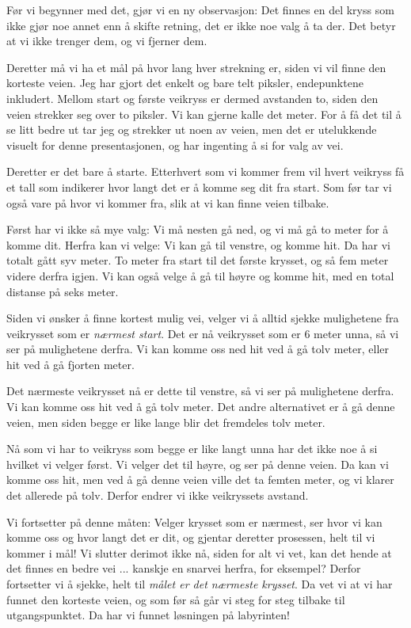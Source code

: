 \documentclass{article}
\newcommand{\hl}[2][primary-dark]{\textcolor{#1}{#2}}
\begin{document}
Før vi begynner med det, gjør vi en ny observasjon: Det finnes en del kryss som ikke gjør noe annet enn å skifte retning, det er ikke noe valg å ta der. Det betyr at vi ikke trenger dem, og vi \hl{fjerner} dem.

Deretter må vi ha et mål på hvor lang hver strekning er, siden vi vil finne den korteste veien. Jeg har gjort det enkelt og bare \hl{telt} piksler, endepunktene inkludert. Mellom start og første veikryss er dermed avstanden to, siden den veien strekker seg over to piksler. Vi kan gjerne kalle det meter. For å få det til å se litt bedre ut tar jeg og \hl{strekker} ut noen av veien, men det er utelukkende visuelt for denne presentasjonen, og har ingenting å si for valg av vei.

Deretter er det bare å \hl{starte}. Etterhvert som vi kommer frem vil hvert veikryss få et tall som indikerer hvor langt det er å komme seg dit fra start. Som før tar vi også vare på hvor vi kommer fra, slik at vi kan finne veien tilbake.

Først har vi ikke så mye valg: Vi må nesten gå \hl{ned}, og vi må gå to meter for å komme dit. Herfra kan vi velge: Vi kan gå til \hl{venstre}, og komme hit. Da har vi totalt gått \hl{syv} meter. To meter fra start til det første krysset, og så fem meter videre derfra igjen. Vi kan også velge å gå til \hl{høyre} og komme hit, med en total distanse på \hl{seks} meter.

Siden vi ønsker å finne kortest mulig vei, velger vi å alltid sjekke mulighetene fra veikrysset som er \emph{nærmest start}. Det er nå veikrysset som er 6 meter unna, så vi ser på mulighetene derfra. Vi kan komme oss ned \hl{hit} ved å gå \hl{tolv} meter, eller \hl{hit} ved å gå \hl{fjorten} meter.

Det nærmeste veikrysset nå er dette til venstre, så vi ser på mulighetene derfra. Vi kan komme oss \hl{hit} ved å gå \hl{tolv} meter. Det andre alternativet er å gå \hl{denne} veien, men siden begge er like lange blir det fremdeles tolv meter.

Nå som vi har to veikryss som begge er like langt unna har det ikke noe å si hvilket vi velger først. Vi velger det til høyre, og ser på \hl{denne} veien. Da kan vi komme oss hit, men ved å gå denne veien ville det ta femten meter, og vi klarer det allerede på tolv. Derfor endrer vi ikke veikryssets avstand.

\hl[secondary-dark]{Vi fortsetter på denne måten: Velger krysset som er nærmest, ser hvor vi kan komme oss og hvor langt det er dit, og gjentar deretter prosessen}, helt til vi kommer i \hl{mål}! Vi slutter derimot ikke nå, siden for alt vi vet, kan det hende at det finnes en bedre vei ... kanskje en snarvei herfra, for eksempel? \hl[secondary-dark]{Derfor fortsetter vi å sjekke}, helt til \emph{målet er det nærmeste krysset}. Da vet vi at vi har funnet den korteste veien, og som \hl{før} så \hl[secondary-dark]{går vi steg for steg tilbake til utgangspunktet}. Da har vi funnet \hl{løsningen} på labyrinten!
\end{document}
